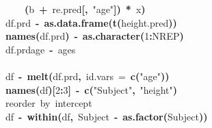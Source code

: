 \documentclass{article}
\makeatletter
\newcommand{\hlnumber}[1]{\textcolor[rgb]{0,0,0}{#1}}%
\newcommand{\hlfunctioncall}[1]{\textcolor[rgb]{.5,0,.33}{\textbf{#1}}}%
\newcommand{\hlstring}[1]{\textcolor[rgb]{.6,.6,1}{#1}}%
\newcommand{\hlkeyword}[1]{\textbf{#1}}%
\newcommand{\hlargument}[1]{\textcolor[rgb]{.69,.25,.02}{#1}}%
\newcommand{\hlcomment}[1]{\textcolor[rgb]{.18,.6,.34}{#1}}%
\newcommand{\hlassignement}[1]{\textbf{#1}}%
\newcommand{\hlsymbol}[1]{#1}%
\newcommand{\hlstd}[1]{\textcolor[rgb]{0,0,0}{#1}}%
\newenvironment{kframe}{%
 \def\FrameCommand##1{\hskip\@totalleftmargin \hskip-\fboxsep
 \colorbox{shadecolor}{##1}\hskip-\fboxsep
     \hskip-\linewidth \hskip-\@totalleftmargin \hskip\columnwidth}%
 \MakeFramed {\advance\hsize-\width
   \@totalleftmargin\z@ \linewidth\hsize
   \@setminipage}}%
 {\par\unskip\endMakeFramed}
\newenvironment{knitrout}{}{} %
\makeatother
\begin{document}
\begin{knitrout}
{\begin{kframe}
\begin{flushleft}
\hlstd{}{\ }{\ }{\ }{\ }\hlkeyword{(}\hlsymbol{b}{\ }\hlkeyword{+}{\ }\hlsymbol{re.pred}\hlkeyword{[}\hlkeyword{,}{\ }\hlstring{"age"}\hlkeyword{]}\hlkeyword{)}{\ }\hlkeyword{*}{\ }\hlsymbol{x}\hlkeyword{)}\hspace*{\fill}\\
\hlstd{}\hlsymbol{df.prd}{\ }\hlassignement{\usebox{\hlnormalsizeboxlessthan}-}{\ }\hlfunctioncall{as.data.frame}\hlkeyword{(}\hlfunctioncall{t}\hlkeyword{(}\hlsymbol{height.pred}\hlkeyword{)}\hlkeyword{)}\hspace*{\fill}\\
\hlstd{}\hlfunctioncall{names}\hlkeyword{(}\hlsymbol{df.prd}\hlkeyword{)}{\ }\hlassignement{\usebox{\hlnormalsizeboxlessthan}-}{\ }\hlfunctioncall{as.character}\hlkeyword{(}\hlnumber{1}\hlkeyword{:}\hlsymbol{NREP}\hlkeyword{)}\hspace*{\fill}\\
\hlstd{}\hlsymbol{df.prd}\hlkeyword{\usebox{\hlnormalsizeboxdollar}}\hlsymbol{age}{\ }\hlassignement{\usebox{\hlnormalsizeboxlessthan}-}{\ }\hlsymbol{ages}\hspace*{\fill}\\
\hlstd{}\hspace*{\fill}\\
\hlstd{}\hlsymbol{df}{\ }\hlassignement{\usebox{\hlnormalsizeboxlessthan}-}{\ }\hlfunctioncall{melt}\hlkeyword{(}\hlsymbol{df.prd}\hlkeyword{,}{\ }\hlargument{id.vars}{\ }\hlargument{=}{\ }\hlfunctioncall{c}\hlkeyword{(}\hlstring{"age"}\hlkeyword{)}\hlkeyword{)}\hspace*{\fill}\\
\hlstd{}\hlfunctioncall{names}\hlkeyword{(}\hlsymbol{df}\hlkeyword{)}\hlkeyword{[}\hlnumber{2}\hlkeyword{:}\hlnumber{3}\hlkeyword{]}{\ }\hlassignement{\usebox{\hlnormalsizeboxlessthan}-}{\ }\hlfunctioncall{c}\hlkeyword{(}\hlstring{"Subject"}\hlkeyword{,}{\ }\hlstring{"height"}\hlkeyword{)}\hspace*{\fill}\\
\hlstd{}\hlcomment{\usebox{\hlnormalsizeboxhash}reorder{\ }by{\ }intercept}\hspace*{\fill}\\
\hlstd{}\hlsymbol{df}{\ }\hlassignement{\usebox{\hlnormalsizeboxlessthan}-}{\ }\hlfunctioncall{within}\hlkeyword{(}\hlsymbol{df}\hlkeyword{,}{\ }\hlsymbol{Subject}{\ }\hlassignement{\usebox{\hlnormalsizeboxlessthan}-}{\ }\hlfunctioncall{as.factor}\hlkeyword{(}\hlsymbol{Subject}\hlkeyword{)}\hlkeyword{)}\hspace*{\fill}\\

\end{flushleft}
\end{kframe}}
\end{knitrout}
\end{document}
